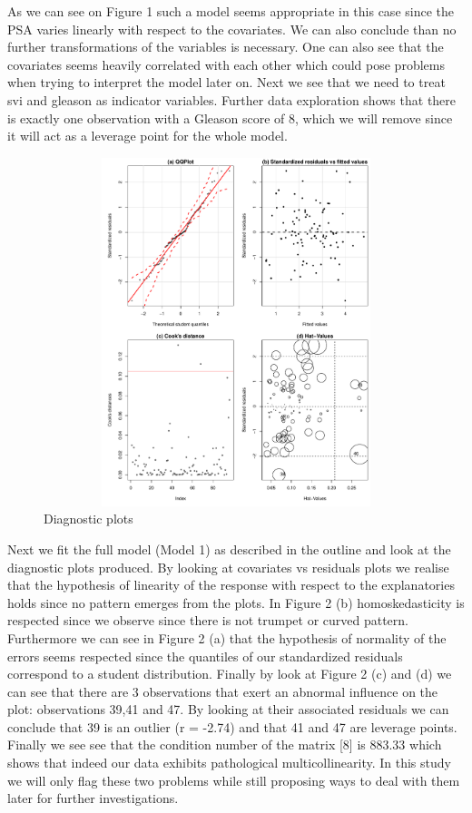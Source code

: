 \documentclass[10pt]{article}
\begin{document}
As we can see on Figure 1 such a model seems appropriate in this case since the PSA varies linearly with respect to the covariates. We can also conclude than no further transformations of the variables is necessary. One can also see that the covariates seems heavily correlated with each other which could pose problems when trying to interpret the model later on. Next we see that we need to treat svi and gleason as indicator variables. Further data exploration shows that there is exactly one observation with a Gleason score of 8, which we will remove since it will act as a leverage point for the whole model.

\begin{figure}[htb]
\begin{center}
\includegraphics[height=4in,width=5in]{diagnostics_full_model.pdf}
\caption{Diagnostic plots}
\end{center}
\end{figure}

Next we fit the full model (Model 1) as described in the outline and look at the diagnostic plots produced. By looking at covariates vs residuals plots we realise that the hypothesis of linearity of the response with respect to the explanatories holds since no pattern emerges from the plots. In Figure 2 (b) homoskedasticity  is respected since we observe since there is not trumpet or curved pattern. Furthermore we can see in Figure 2 (a) that the hypothesis of normality of the errors seems respected since the quantiles of our standardized residuals correspond to a student distribution. Finally by look at Figure 2 (c) and (d) we can see that there are 3 observations that exert an abnormal influence on the plot: observations 39,41 and 47. By looking at their associated residuals we can conclude that 39 is an outlier (r = -2.74) and that 41 and 47 are leverage points. Finally we see see that the condition number of the matrix [8] is 883.33 which shows that indeed our data exhibits pathological multicollinearity. In this study we will only flag these two problems while still proposing ways to deal with them later for further investigations.
\end{document}
